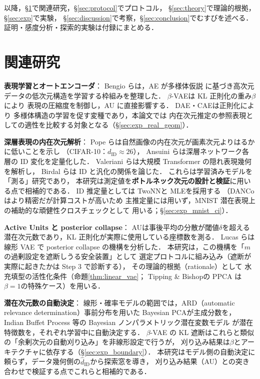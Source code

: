 \documentclass[11pt,a4paper]{jsarticle}
\newcommand{\dID}{d_{\mathrm{ID}}}
\newcommand{\hatdID}{\hat{d}_{\mathrm{ID}}}
\begin{document}
以降，§\ref{sec:related}で関連研究，§\ref{sec:protocol}でプロトコル，
§\ref{sec:theory}で理論的根拠，§\ref{sec:exp}で実験，
§\ref{sec:discussion}で考察，§\ref{sec:conclusion}でむすびを述べる．
証明・感度分析・探索的実験は付録にまとめる．

\section{関連研究}\label{sec:related}

\textbf{表現学習とオートエンコーダ}：
Bengio ら\cite{bengio2013representation}は，AE が多様体仮説
\cite{fefferman2016manifold}に基づき高次元データの低次元構造を学習する枠組みを整理した．
$\beta$-VAE\cite{higgins2017betavae}は KL 正則化の重み$\beta$により
表現の圧縮度を制御し，AU に直接影響する．
DAE\cite{alain2014dae}・CAE\cite{rifai2011cae}は正則化により
多様体構造の学習を促す変種であり，本論文では
内在次元推定の参照表現としての適性を比較する対象となる（§\ref{sec:exp_real_geom}）．

\textbf{深層表現の内在次元解析}：
Pope ら\cite{pope2021intrinsic}は自然画像の内在次元が画素次元よりはるかに低いことを示し
（CIFAR-10：$\dID \approx 26$），
Ansuini ら\cite{ansuini2019intrinsic}は深層ネットワーク各層の ID 変化を定量化した．
Valeriani ら\cite{valeriani2023geometry}は大規模 Transformer の隠れ表現幾何を解析し，
Birdal ら\cite{birdal2021intrinsic}は ID と汎化の関係を論じた．
これらは学習済みモデルを「測る」研究であり，
本研究は測定値を\textbf{ボトルネック次元の設計と検証}に用いる点で相補的である．
ID 推定量としては TwoNN\cite{facco2017twonn}と MLE\cite{levina2005mle}を採用する
（DANCo\cite{ceruti2014danco}はより精密だが計算コストが高いため
主推定量には用いず，MNIST 潜在表現上の補助的な頑健性クロスチェックとして
用いる；§\ref{sec:exp_mnist_ci}）．

\textbf{Active Units と posterior collapse}：
AU\cite{higgins2017betavae,lucas2019elbo}は事後平均の分散が閾値$\delta$を超える
潜在次元数であり，KL 正則化が実際に使用している座標数を測る．
Lucas ら\cite{lucas2019elbo}は線形 VAE で posterior collapse の機構を分析した．
本研究は，この機構を「$m$の過剰設定を遮断しうる安全装置」として
選定プロトコルに組み込み（遮断が実際に起きたかは Step 3 で診断する），
その理論的根拠（rationale）として
水充填型の活性化条件（命題\ref{thm:linear_vae}；
Tipping \& Bishop\cite{tippingbishop1999ppca}の PPCA は$\beta=1$の特殊ケース）を用いる．

\textbf{潜在次元数の自動決定}：
線形・確率モデルの範囲では，ARD（automatic relevance determination）事前分布を用いた
Bayesian PCA\cite{bishop1999bayesian}が主成分数を，
Indian Buffet Process 等の Bayesian ノンパラメトリック潜在変数モデル
\cite{ghahramani2005infinite}が潜在特徴数を，それぞれ学習中に自動決定する．
$\beta$-VAE の KL 遮断はこれらと類似の「余剰次元の自動刈り込み」を非線形設定で行うが，
刈り込み結果は$\beta$とアーキテクチャに依存する（§\ref{sec:exp_boundary}）．
本研究はモデル側の自動決定に頼らず，データ幾何側の$\hatdID$から探索窓を導き，
刈り込み結果（AU）との突き合わせで検証する点でこれらと相補的である．
\end{document}
